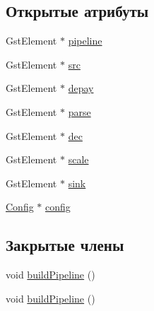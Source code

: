 \subsection*{Открытые атрибуты}
\begin{DoxyCompactItemize}
\item 
Gst\+Element $\ast$ \hyperlink{class_player_aa8cd0e05525fd7cf5ee60b40b1388254}{pipeline}
\item 
Gst\+Element $\ast$ \hyperlink{class_player_ac3fb217cb2001134249fafcba07fe7e7}{src}
\item 
Gst\+Element $\ast$ \hyperlink{class_player_a612fee9ac56aee91fd64e770f946e2e4}{depay}
\item 
Gst\+Element $\ast$ \hyperlink{class_player_a9aafd7f61221255c78b81c8715148676}{parse}
\item 
Gst\+Element $\ast$ \hyperlink{class_player_a79ccb8bdee134c230a8c242d5123356d}{dec}
\item 
Gst\+Element $\ast$ \hyperlink{class_player_a0cb0a126d4348e773fd2627c2a25d9e1}{scale}
\item 
Gst\+Element $\ast$ \hyperlink{class_player_aabd00fa1e998c6e4db1a83e6fee285ba}{sink}
\item 
\hyperlink{class_config}{Config} $\ast$ \hyperlink{class_player_a53cd9b524dac60ecacd99f0812c71332}{config}
\end{DoxyCompactItemize}
\subsection*{Закрытые члены}
\begin{DoxyCompactItemize}
\item 
void \hyperlink{class_player_aca2616201a97a901612fd9df7a900ca1}{build\+Pipeline} ()
\item 
void \hyperlink{class_player_aca2616201a97a901612fd9df7a900ca1}{build\+Pipeline} ()
\end{DoxyCompactItemize}
